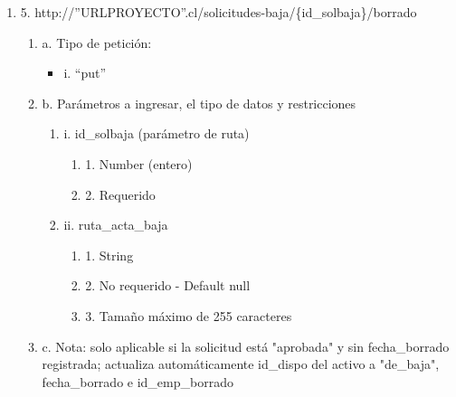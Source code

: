 \begin{enumerate}
    \item 5. http://”URLPROYECTO”.cl/solicitudes-baja/\{id\_solbaja\}/borrado
    \begin{enumerate}
        \item a. Tipo de petición:
            \begin{itemize}
               \item i. “put”
            \end{itemize}
        \item b. Parámetros a ingresar, el tipo de datos y restricciones
            \begin{enumerate}
                \item i. id\_solbaja (parámetro de ruta)
                    \begin{enumerate}
                        \item 1. Number (entero)
                        \item 2. Requerido
                    \end{enumerate}
                \item ii. ruta\_acta\_baja
                    \begin{enumerate}
                        \item 1. String
                        \item 2. No requerido - Default null
                        \item 3. Tamaño máximo de 255 caracteres
                    \end{enumerate}
            \end{enumerate}
        \item c. Nota: solo aplicable si la solicitud está "aprobada" y sin fecha\_borrado registrada; actualiza automáticamente id\_dispo del activo a "de\_baja", fecha\_borrado e id\_emp\_borrado
    \end{enumerate}
\end{enumerate}
